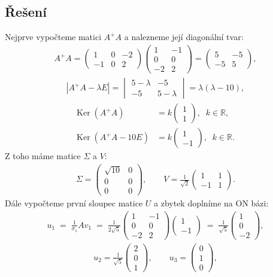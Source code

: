 \documentclass[]{article}
\newcommand{\Ker}{\mathrm{Ker}\;}
\newcommand{\mat}[1]{\begin{pmatrix}#1\end{pmatrix}}
\newcommand{\recip}[1]{\frac{1}{#1}}
\newcommand{\recipsqrt}[1]{\frac{1}{\sqrt{#1}}}
\begin{document}
\subsection{Řešení}
Nejprve vypočteme matici $A^+A$ a nalezneme její diagonální tvar:
\begin{align*}
  A^+A = \mat{1&0&-2\\-1&0&2}\mat{1&-1\\0&0\\-2&2} = \mat{5&-5\\-5&5},
\end{align*}
\begin{align*}
  |A^+A - \lambda E| = \begin{vmatrix}
      5 - \lambda & -5 \\
      -5 & 5 - \lambda
  \end{vmatrix}
  = \lambda (\lambda - 10),
\end{align*}
\begin{align*}
  \Ker(A^+A) &= k \mat{1 \\ 1}, \;\; k \in \mathbb{R}, \\
  \Ker(A^+A - 10E) &= k \mat{1 \\ -1}, \;\; k \in \mathbb{R}.
\end{align*}
Z toho máme matice $\Sigma$ a $V$:
\begin{align*}
  \Sigma = \mat{\sqrt{10} & 0 \\ 0 & 0 \\ 0 & 0},
  \hspace{2em}
  V = \recipsqrt{2} \mat{1 & 1 \\ -1 & 1}.
\end{align*}
Dále vypočteme první sloupec matice $U$ a zbytek doplníme na ON bázi:
\begin{align*}
  u_1
  \;=\; \recip{\sigma_1} A v_1
  \;=\; \recip{2\sqrt{5}} \mat{1&-1\\0&0\\-2&2} \mat{1\\-1}
  \;=\; \recipsqrt{5} \mat{1\\0\\-2},
\end{align*}
\begin{align*}
  u_2 = \recipsqrt{5} \mat{2\\0\\1},
  \hspace{2em}
  u_3 = \mat{0\\1\\0},
\end{align*}
\end{document}
